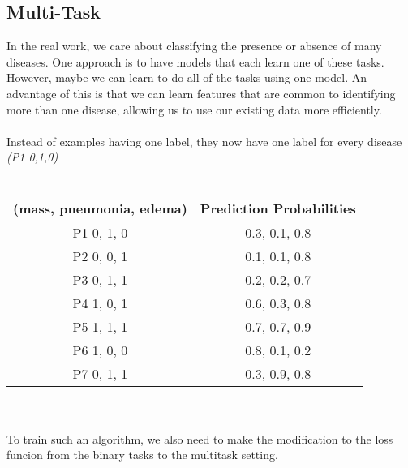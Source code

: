 \documentclass[a4paper,12pt]{article}
\begin{document}
\subsection{Multi-Task}
In the real work, we care about classifying the presence or absence of many diseases. One approach is to have models that each learn one of these tasks.\\
However, maybe we can learn to do all of the tasks using one model. An advantage of this is that we can learn features that are common to identifying more than one disease, allowing us to use our existing data more efficiently.\\
\\
Instead of examples having one label, they now have one label for every disease \textit{(P1 0,1,0)}\\
\\
\begin{tabular}{|c c|}
	\hline
	(mass, pneumonia, edema) & Prediction Probabilities \\
	\hline
	P1 0, 1, 0 & 0.3, 0.1, 0.8 \\
	P2 0, 0, 1 & 0.1, 0.1, 0.8 \\
	P3 0, 1, 1 & 0.2, 0.2, 0.7 \\
	P4 1, 0, 1 & 0.6, 0.3, 0.8 \\
	P5 1, 1, 1 & 0.7, 0.7, 0.9 \\
	P6 1, 0, 0 & 0.8, 0.1, 0.2 \\
	P7 0, 1, 1 & 0.3, 0.9, 0.8 \\
	\hline
\end{tabular}\\
\\
To train such an algorithm, we also need to make the modification to the loss funcion from the binary tasks to the multitask setting.
\end{document}
